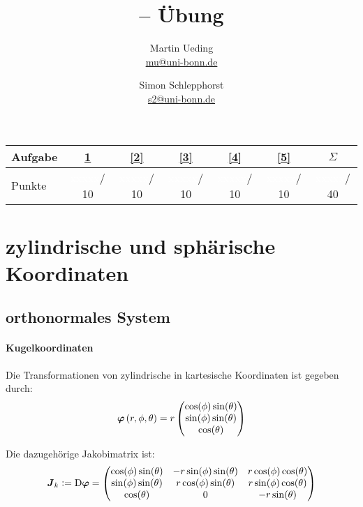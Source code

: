 \documentclass[11pt, ngerman, fleqn]{article}
\title{\themodul{} -- Übung \theuebung \\ \vspace{0.5cm} \large{\thegruppe}}
\author{Martin Ueding \\ \small{\href{mailto:mu@uni-bonn.de}{mu@uni-bonn.de}} \and Simon Schlepphorst \\ \small{\href{mailto:s2@uni-bonn.de}{s2@uni-bonn.de}}}
\newcommand{\punkte}{\textcolor{white}{xxxxx}}
\newcommand{\tens}[1]{\boldsymbol{#1}}
\renewcommand{\vec}[1]{\boldsymbol{#1}}
\begin{document}
\maketitle

\begin{table}[h]
	\centering
	\begin{tabular}{l|c|c|c|c|c|c}
		Aufgabe & \ref{1} & \ref{2} & \ref{3} & \ref{4} & \ref{5} & $\Sigma$   \\
		\hline
		Punkte & \punkte / 10 & \punkte / 10 & \punkte / 10 & \punkte / 10 & \punkte / 10 & \punkte / 40
	\end{tabular}
\end{table}


\section{zylindrische und sphärische Koordinaten}
\label{1}

\subsection{orthonormales System}

\paragraph{Kugelkoordinaten}

Die Transformationen von zylindrische in kartesische Koordinaten ist gegeben durch:
\[
	\vec\varphi\del{r, \phi, \theta} = r \begin{pmatrix}
		\cos(\phi) \sin(\theta) \\
		\sin(\phi) \sin(\theta) \\
		\cos(\theta)
	\end{pmatrix}
\]

Die dazugehörige Jakobimatrix ist:
\[
	\tens J_k := \Dif \vec\varphi = \begin{pmatrix}
		\cos(\phi) \sin(\theta) & -r \sin(\phi)\sin(\theta) & r \cos(\phi) \cos(\theta) \\
		\sin(\phi) \sin(\theta) & r \cos(\phi)\sin(\theta) & r \sin(\phi)\cos(\theta) \\
						 \cos(\theta) & 0 & - r \sin(\theta)
	\end{pmatrix}
\]
\end{document}

